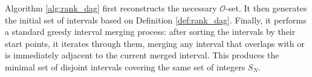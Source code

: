 Algorithm \ref{alg:rank_dag} first reconstructs the necessary $\mathcal{O}$-set. It then generates the initial set of intervals based on Definition \ref{def:rank_dag}. Finally, it performs a standard greedy interval merging process: after sorting the intervals by their start points, it iterates through them, merging any interval that overlaps with or is immediately adjacent to the current merged interval. This produces the minimal set of disjoint intervals covering the same set of integers $S_N$.
